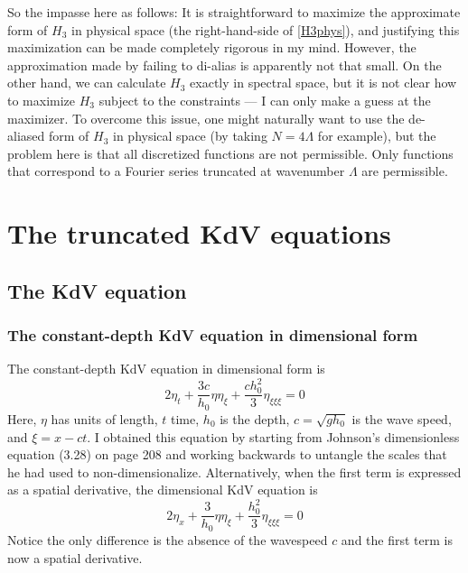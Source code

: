 \documentclass[12pt]{article}
\newcommand{\np}{\newpage \noindent}
\begin{document}
So the impasse here as follows: It is straightforward to maximize the approximate form of $H_3$ in physical space (the right-hand-side of \eqref{H3phys}), and justifying this maximization can be made completely rigorous in my mind. However, the approximation made by failing to di-alias is apparently not that small. On the other hand, we can calculate $H_3$ exactly in spectral space, but it is not clear how to maximize $H_3$ subject to the constraints --- I can only make a guess at the maximizer. To overcome this issue, one might naturally want to use the de-aliased form of $H_3$ in physical space (by taking $N = 4 \Lambda$ for example), but the problem here is that all discretized functions are not permissible. Only functions that correspond to a Fourier series truncated at wavenumber $\Lambda$ are permissible.


\np
\section{The truncated KdV equations}

\subsection{The KdV equation}

\subsubsection{The constant-depth KdV equation in dimensional form}

The constant-depth KdV equation in dimensional form is
\begin{equation}
2 \eta_t + \frac{3 c}{h_0} \eta \eta_{\xi} + \frac{c h_0^2}{3} \eta_{\xi \xi \xi} = 0
\end{equation}
Here, $\eta$ has units of length, $t$ time, $h_0$ is the depth, $c = \sqrt{g h_0}$ is the wave speed, and $\xi = x - ct$. I obtained this equation by starting from Johnson's dimensionless equation (3.28) on page 208 and working backwards to untangle the scales that he had used to non-dimensionalize.
Alternatively, when the first term is expressed as a spatial derivative, the dimensional KdV equation is
\begin{equation}
2 \eta_x + \frac{3}{h_0} \eta \eta_{\xi} + \frac{h_0^2}{3} \eta_{\xi \xi \xi} = 0
\end{equation}
Notice the only difference is the absence of the wavespeed $c$ and the first term is now a spatial derivative.
\end{document}
